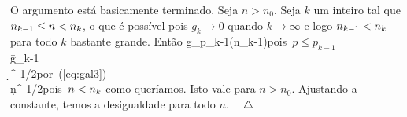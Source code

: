 O argumento está basicamente terminado. Seja $n>n_0$. Seja $k$ um inteiro tal que
$n_{k-1}\leq n<n_k$, o que é possível pois $g_k\to0$ quando $k\to\infty$ e logo
$n_{k-1}<n_k$ para todo $k$ bastante grande. Então
\beqnn
\gpn\le g_{p_{k-1}}(n_{k-1})\quad\mbox{pois $p\leq p_{k-1}$}\\
\=g_{k-1}\\
\le\d\nk^{-1/2}\quad\mbox{por~(\ref{eq:gal3})}\\
\le\d n^{-1/2}\quad\mbox{pois $n<\nk$}
\eeqnn
como queríamos. Isto vale para $n>n_0$. Ajustando a constante, temos a
desigualdade para todo $n$. $\quad\triangle$











